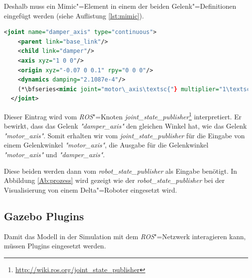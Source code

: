 Deshalb muss ein Mimic"=Element in einem der beiden Gelenk"=Definitionen eingefügt werden (siehe Auflistung \ref{lst:mimic}). 
\begin{lstlisting}[language=xml, captionpos=b, caption=Mimic in URDF-Joint, label={lst:mimic}, gobble=2]
  <joint name="damper_axis" type="continuous">
    <parent link="base_link"/>
    <child link="damper"/>
    <axis xyz="1 0 0"/>
    <origin xyz="-0.07 0 0.1" rpy="0 0 0"/>
    <dynamics damping="2.1087e-4"/>
    (*\bfseries<mimic joint="motor\_axis\textsc{"} multiplier="1\textsc{"} offset="0"/>*)
  </joint>
\end{lstlisting}

Dieser Eintrag wird vom \textit{ROS}"=Knoten \textit{joint\_state\_publisher}\footnote{\url{http://wiki.ros.org/joint_state_publisher}} interpretiert.
Er bewirkt, dass das Gelenk \textit{\textit{"}damper\_axis\textit{"}} den gleichen Winkel hat, wie das Gelenk \textit{\textit{"}motor\_axis\textit{"}}.
Somit erhalten wir vom \textit{joint\_state\_publisher} für die Eingabe von einem Gelenkwinkel \textit{\textit{"}motor\_axis\textit{"}}, die Ausgabe für die Gelenkwinkel \textit{\textit{"}motor\_axis\textit{"}} und \textit{\textit{"}damper\_axis\textit{"}}.

Diese beiden werden dann vom \textit{robot\_state\_publisher} als Eingabe benötigt.
In Abbildung \ref{Ab:prozess} wird gezeigt wie der \textit{robot\_state\_publisher} bei der Visualisierung von einem Delta"=Roboter eingesetzt wird.

\subsection{Gazebo Plugins}
Damit das Modell in der Simulation mit dem \textit{ROS}"=Netzwerk interagieren kann, müssen Plugins eingesetzt werden.

